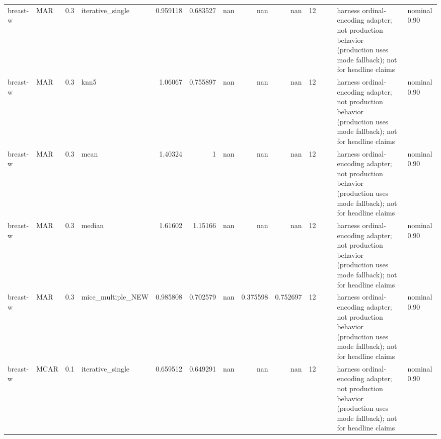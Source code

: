 \begin{table}[ht]
\begin{tabular}{llrlrrrrrrllll}
 breast-w             & MAR         &         0.3 & iterative\_single  &       0.959118 &             0.683527 &               nan        &                     nan        &                       nan        &        12 &                    &                                         & harness ordinal-encoding adapter; not production behavior (production uses mode fallback); not for headline claims & nominal 0.90              \\
 breast-w             & MAR         &         0.3 & knn5              &       1.06067  &             0.755897 &               nan        &                     nan        &                       nan        &        12 &                    &                                         & harness ordinal-encoding adapter; not production behavior (production uses mode fallback); not for headline claims & nominal 0.90              \\
 breast-w             & MAR         &         0.3 & mean              &       1.40324  &             1        &               nan        &                     nan        &                       nan        &        12 &                    &                                         & harness ordinal-encoding adapter; not production behavior (production uses mode fallback); not for headline claims & nominal 0.90              \\
 breast-w             & MAR         &         0.3 & median            &       1.61602  &             1.15166  &               nan        &                     nan        &                       nan        &        12 &                    &                                         & harness ordinal-encoding adapter; not production behavior (production uses mode fallback); not for headline claims & nominal 0.90              \\
 breast-w             & MAR         &         0.3 & mice\_multiple\_NEW &       0.985808 &             0.702579 &               nan        &                       0.375598 &                         0.752697 &        12 &                    &                                         & harness ordinal-encoding adapter; not production behavior (production uses mode fallback); not for headline claims & nominal 0.90              \\
 breast-w             & MCAR        &         0.1 & iterative\_single  &       0.659512 &             0.649291 &               nan        &                     nan        &                       nan        &        12 &                    &                                         & harness ordinal-encoding adapter; not production behavior (production uses mode fallback); not for headline claims & nominal 0.90              \\

\end{tabular}
\end{table}
